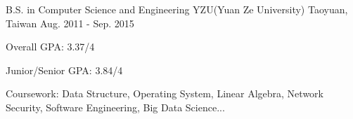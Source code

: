 \begin{cventries}
  \cventry
    {B.S. in Computer Science and Engineering}
    {YZU(Yuan Ze University)}
    {Taoyuan, Taiwan}
    {Aug. 2011 - Sep. 2015}
    {
      \begin{cvitems}
      \item{Overall GPA: 3.37/4}
      \item{Junior/Senior GPA: 3.84/4 }
      \item{Coursework: Data Structure, Operating System, Linear Algebra, Network Security, Software Engineering, Big Data Science...}
      \end{cvitems}
    }

\end{cventries}
\vspace{-\baselineskip}
